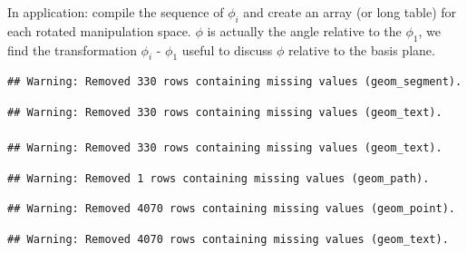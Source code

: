 \documentclass{monashthesis}
\begin{document}
In application: compile the sequence of \(\phi_i\) and create an array
(or long table) for each rotated manipulation space. \(\phi\) is
actually the angle relative to the \(\phi_1\), we find the
transformation \(\phi_i\) - \(\phi_1\) useful to discuss \(\phi\)
relative to the basis plane.

\begin{verbatim}
## Warning: Removed 330 rows containing missing values (geom_segment).
\end{verbatim}

\begin{verbatim}
## Warning: Removed 330 rows containing missing values (geom_text).

## Warning: Removed 330 rows containing missing values (geom_text).
\end{verbatim}

\begin{verbatim}
## Warning: Removed 1 rows containing missing values (geom_path).
\end{verbatim}

\begin{verbatim}
## Warning: Removed 4070 rows containing missing values (geom_point).
\end{verbatim}

\begin{verbatim}
## Warning: Removed 4070 rows containing missing values (geom_text).
\end{verbatim}
\end{document}
